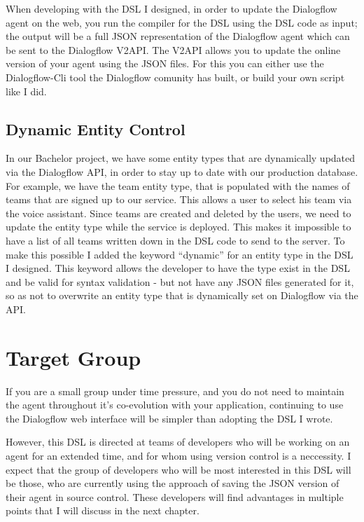 When developing with the DSL I designed, in order to update the Dialogflow agent on the web, you run the compiler for the DSL using the DSL code as input; the output will be a full JSON representation of the Dialogflow agent which can be sent to the Dialogflow V2API.
The V2API allows you to update the online version of your agent using the JSON files. For this you can either use the Dialogflow-Cli tool \cite{0xcaff2018} the Dialogflow comunity has built, or build your own script like I did.

\subsection{Dynamic Entity Control}

In our Bachelor project, we have some entity types that are dynamically updated via the Dialogflow API, in order to stay up to date with our production database. For example, we have the team entity type, that is populated with the names of teams that are signed up to our service. This allows a user to select his team via the voice assistant.
Since teams are created and deleted by the users, we need to update the entity type while the service is deployed.
This makes it impossible to have a list of all teams written down in the DSL code to send to the server. 
To make this possible I added the keyword “dynamic” for an entity type in the DSL I designed.
This keyword allows the developer to have the type exist in the DSL and be valid for syntax validation - but not have any JSON files generated for it, so as not to overwrite an entity type that is dynamically set on Dialogflow via the API.

\section{Target Group}

If you are a small group under time pressure, and you do not need to maintain the agent throughout it's co-evolution with your application, continuing to use the Dialogflow web interface will be simpler than adopting the DSL I wrote.

However, this DSL is directed at teams of developers who will be working on an agent for an extended time, and for whom using version control is a neccessity.
I expect that the group of developers who will be most interested in this DSL will be those, who are currently using the approach of saving the JSON  version of their agent in source control.
These developers will find advantages in multiple points that I will discuss in the next chapter.

